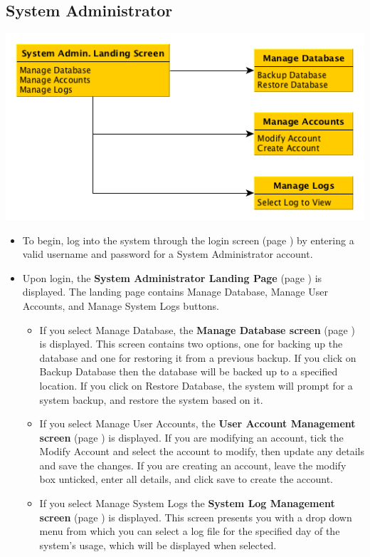 \documentclass{article}
\begin{document}
\subsection{System Administrator}
\centerline{\includegraphics[scale=.6]{../images/UIMockups/pngs/sysAdmin}}
\begin{itemize}
	\item To begin, log into the system through the login screen (page \pageref{login})
		by entering a valid username and password for a System Administrator account.
	\item Upon login, the \textbf{System Administrator Landing Page} (page 
		\pageref{landPg}) is displayed. The landing page contains Manage Database, 
		Manage User Accounts, and Manage System Logs buttons.
	\begin{itemize}
		\item If you select Manage Database, the \textbf{Manage Database screen} 
			(page \pageref{manageDB}) is displayed. This screen contains two 
			options, one for backing up the database and one for restoring it from 
			a previous backup. If you click on Backup Database then the database
			will be backed up to a specified location. If you click on Restore 
			Database, the system will prompt for a system backup, and restore
			the system based on it.
		\item If you select Manage User Accounts, the \textbf{User Account 
			Management screen} (page \pageref{manageAccts}) is displayed. If you are
			modifying an account, tick the Modify Account and select the account to
			modify, then update any details and save the changes. If you are creating an
			account, leave the modify box unticked, enter all details, and click save to
			create the account.
		\item If you select Manage System Logs the \textbf{System Log Management 
			screen} (page \pageref{manageLogs}) is displayed. This screen presents 
			you with a drop down menu from which you can select a log file for the 
			specified day of the system's usage, which will be displayed when selected.
	\end{itemize}
\end{itemize}
\end{document}
